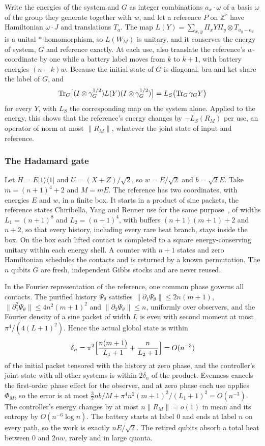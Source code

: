 Write the energies of the system and $G$ as integer combinations $a_x\cdot\omega$ of a basis $\omega$ of the group they generate together with $w$, and let a reference $P$ on $\mathbb Z^r$ have Hamiltonian $\omega\cdot J$ and translations $T_a$. The map $L(Y)=\sum_{x,y}\Pi_xY\Pi_y\otimes T_{a_y-a_x}$ is a unital $*$-homomorphism, so $L(W_M)$ is unitary, and it conserves the energy of system, $G$ and reference exactly. At each use, also translate the reference's $w$-coordinate by one while a battery label moves from $k$ to $k+1$, with battery energies $(n-k)w$. Because the initial state of $G$ is diagonal, bra and ket share the label of $G$, and
\[
\operatorname{Tr}_G\bigl[(I\otimes\gamma_G^{1/2})L(Y)(I\otimes\gamma_G^{1/2})\bigr]=L_S\bigl(\operatorname{Tr}_G\gamma_GY\bigr)
\]
for every $Y$, with $L_S$ the corresponding map on the system alone. Applied to the energy, this shows that the reference's energy changes by $-L_S(R_M)$ per use, an operator of norm at most $\|R_M\|$, whatever the joint state of input and reference.

\subsubsection{The Hadamard gate}

Let $H=E|1\rangle\langle1|$ and $U=(X+Z)/\sqrt2$, so $w=E/\sqrt2$ and $b=\sqrt2E$. Take $m=(n+1)^4+2$ and $M=mE$. The reference has two coordinates, with energies $E$ and $w$, in a finite box. It starts in a product of sine packets, the reference states Chiribella, Yang and Renner use for the same purpose~\cite{ChiribellaYangRenner21}, of widths $L_1=(n+1)^8$ and $L_2=(n+1)^4$, with buffers $(n+1)(m+1)+2$ and $n+2$, so that every history, including every rare heat branch, stays inside the box. On the box each lifted contact is completed to a square energy-conserving unitary within each energy shell. A counter with $n+1$ states and zero Hamiltonian schedules the contacts and is returned by a known permutation. The $n$ qubits $G$ are fresh, independent Gibbs stocks and are never reused.

In the Fourier representation of the reference, one common phase governs all contacts. The purified history $\Psi_\theta$ satisfies $\|\partial_1\Psi_\theta\|\le2n(m+1)$, $\|\partial_1^2\Psi_\theta\|\le4n^2(m+1)^2$ and $\|\partial_2\Psi_\theta\|\le n$, uniformly over observers, and the Fourier density of a sine packet of width $L$ is even with second moment at most $\pi^4/(4(L+1)^2)$. Hence the actual global state is within
\[
\delta_n=\pi^2\Bigl[\frac{n(m+1)}{L_1+1}+\frac n{L_2+1}\Bigr]=O(n^{-3})
\]
of the initial packet tensored with the history at zero phase, and the controller's joint state with all other systems is within $2\delta_n$ of the product. Evenness cancels the first-order phase effect for the observer, and at zero phase each use applies $\Phi_M$, so the error is at most $\frac32nb/M+\pi^4n^2(m+1)^2/(L_1+1)^2=O(n^{-3})$. The controller's energy changes by at most $n\|R_M\|=o(1)$ in mean and its entropy by $O(n^{-6}\log n)$. The battery starts at label $0$ and ends at label $n$ on every path, so the work is exactly $nE/\sqrt2$. The retired qubits absorb a total heat between $0$ and $2nw$, rarely and in large quanta.

